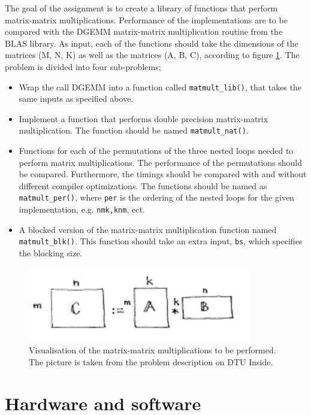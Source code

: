 The goal of the assignment is to create a library of functions that perform matrix-matrix multiplications. Performance of the implementations are to be compared with the DGEMM matrix-matrix multiplication routine from the BLAS library. As input, each of the functions should take the dimensions of the matrices (M, N, K) as well as the matrices (A, B, C), according to figure \ref{fig:matmult}. The problem is divided into four sub-problems; 
\begin{itemize}
    \item Wrap the call DGEMM into a function called \texttt{matmult\_lib()}, that takes the same inputs as
    specified above.
    \item Implement a function that performs double precision matrix-matrix multiplication. The function should be named \texttt{matmult\_nat()}.
    \item Functions for each of the permutations of the three nested loops needed to perform matrix multiplications. The performance of the permutations should be compared. Furthermore, the timings should be compared with and without different compiler optimizations. The functions should be named as \texttt{matmult\_per()}, where \texttt{per} is the ordering of the nested loops for the given implementation, e.g. \texttt{nmk,knm}, ect.
    \item A blocked version of the matrix-matrix multiplication function named \texttt{matmult\_blk()}. This function should take an extra input, \texttt{bs}, which specifies the blocking size.
\end{itemize}

\begin{figure}[h]
    \centering
    \includegraphics[]{contents/pics_1/matmult.PNG}
    \caption{Visualisation of the matrix-matrix multiplications to be performed. The picture is taken from the problem description on DTU Inside.}
    \label{fig:matmult}
\end{figure}

\section{Hardware and software}\label{sec:hard}


